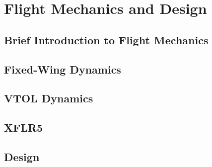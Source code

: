 
\chapter{Flight Mechanics and Design} \label{chap:4}

\section{Brief Introduction to Flight Mechanics}

\section{Fixed-Wing Dynamics}

\section{VTOL Dynamics}

\section{XFLR5}

\section{Design}




